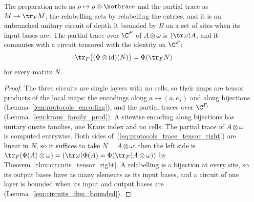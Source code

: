 \begin{lemma}
    \label{lem:protocols_dilation_circuits}
    \leanok
    The preparation acts as $\rho\mapsto\rho\otimes\ketbra ee$ and the partial trace as
    $M\mapsto\tr_F M$; the relabelling acts by relabelling the entries, and it is an
    unbranched unitary circuit of depth $0$, bounded by $B$ on a set of sites when its input
    bases are. The partial trace over $\C^F$ of
    $A\otimes\omega$ is $(\tr\omega)A$, and it commutes with a circuit tensored with the
    identity on $\C^F$:
    \begin{align}
        \tr_F\bigl((\Phi\otimes\mathrm{id})(N)\bigr)&=\Phi(\tr_FN)
        \label{eq:protocols_trace_tensor_right}
    \end{align}
    for every matrix $N$.
\end{lemma}
\begin{proof}\leanok
    The three circuits are single layers with no cells, so their maps are tensor products of
    the local maps: the encodings along $a\mapsto(a,e_s)$ and along bijections
    (Lemma~\ref{lem:protocols_encoding}), and the partial traces over $\C^{F_s}$
    (Lemma~\ref{lem:kraus_family_prod}). A sitewise encoding along bijections has unitary
    onsite families, one Kraus index and no cells. The partial trace of $A\otimes\omega$ is
    computed entrywise. Both sides of~(\ref{eq:protocols_trace_tensor_right}) are linear in
    $N$, so it suffices to take $N=A\otimes\omega$; then the left side is
    $\tr_F(\Phi(A)\otimes\omega)=(\tr\omega)\Phi(A)=\Phi(\tr_F(A\otimes\omega))$ by
    Theorem~\ref{thm:circuits_tensor_right}. A relabelling is a bijection at every site, so its
    output bases have as many elements as its input bases, and a circuit of one layer is bounded
    when its input and output bases are (Lemma~\ref{lem:circuits_dim_bounded}).
\end{proof}


